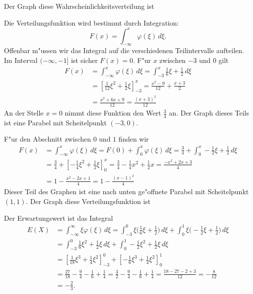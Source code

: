 \begin{loesung}
\begin{teilaufgaben}
\item
Der Graph diese Wahrscheinlichkeitsverteilung ist
\begin{center}
\end{center}
\item Die Verteilungsfunktion wird bestimmt durch Integration:
\[
F(x)=\int_{-\infty}^x\varphi(\xi)\,d\xi.
\]
Offenbar m"ussen wir das Integral auf die verschiedenen Teilintervalle
aufteilen. Im Interval $(-\infty,-1]$ ist sicher $F(x)=0$. F"ur $x$ zwischen
$-3$ und $0$ gilt
\begin{align*}
F(x)&=\int_{-\infty}^x\varphi(\xi)\,d\xi =\int_{-3}^x\frac16\xi+\frac12\,d\xi
\\
&=
\left[\frac1{12}\xi^2+\frac12\xi\right]_{-3}^x=\frac{x^2-9}{12}+\frac{x+3}2
\\
&
=\frac{x^2+6x+9}{12}=\frac{(x+3)^2}{12}
\end{align*}
An der Stelle $x=0$ nimmt diese Funktion den Wert $\frac34$ an.
Der Graph dieses Teils ist eine Parabel mit Scheitelpunkt $(-3,0)$.

F"ur den Abschnitt zwischen $0$ und $1$ finden wir
\begin{align*}
F(x)
&=
\int_{-\infty}^x\varphi(\xi)\,d\xi
=F(0)+\int_0^x\varphi(\xi)\,d\xi
=\frac34+\int_0^x-\frac12\xi+\frac12\,d\xi\\
&=\frac34+\left[-\frac14\xi^2+\frac12\xi\right]_0^x
=\frac34-\frac14x^2+\frac12x
=\frac{-x^2+2x+3}4\\
&=1-\frac{x^2-2x+1}{4}
=1-\frac{(x-1)^2}4
\end{align*}
Dieser Teil des Graphen ist eine nach unten ge"offnete Parabel mit
Scheitelpunkt $(1,1)$.
Der Graph diese Verteilungsfunktion ist
\begin{center}
\end{center}
\item
Der Erwartungswert ist das Integral
\begin{align*}
E(X)&=\int_{-\infty}^\infty\xi\varphi(\xi)\,d\xi
=
\int_{-3}^0\xi\biggl(\frac16\xi+\frac12\biggr)\,d\xi
+\int_0^1\xi\biggl(-\frac12\xi+\frac12\biggr)\,d\xi
\\
&=
\int_{-3}^0\frac16\xi^2+\frac12\xi\,d\xi
+\int_0^1-\frac12\xi^2+\frac12\xi\,d\xi
\\
&=\left[\frac1{18}\xi^3+\frac14\xi^2\right]_{-3}^0
+\left[-\frac16\xi^3+\frac14\xi^2\right]_0^1\\
&=\frac{27}{18}-\frac94-\frac16+\frac14
=\frac{3}{2}-\frac94-\frac16+\frac14
=\frac{18-27-2+3}{12}
=-\frac{8}{12}
\\
&=-\frac23.
\end{align*}
\end{teilaufgaben}
\end{loesung}
